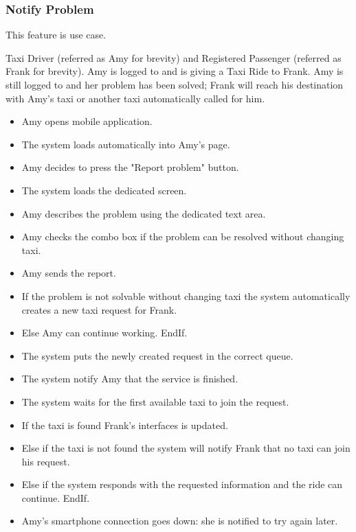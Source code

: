\subsubsection{Notify Problem}
This feature is  use case.
\begin{itemize}
	 Taxi Driver (referred as Amy for brevity) and Registered Passenger (referred as Frank for brevity).
	 Amy is logged to \myTaxiService{} and is giving a Taxi Ride to Frank.
	 Amy is still logged to \myTaxiService{} and her problem has been solved; Frank will reach his destination with Amy's taxi or another taxi automatically called for him.
	\begin{itemize}
		\item Amy opens \myTaxiService{} mobile application.
		\item The system loads automatically into Amy's page.
		\item Amy decides to press the "Report problem" button.
		\item The system loads the dedicated screen.
		\item Amy describes the problem using the dedicated text area.
		\item Amy checks the combo box if the problem can be resolved without changing taxi.
		\item Amy sends the report.
		\item If the problem is not solvable without changing taxi the system automatically creates a new taxi request for Frank.
		\item Else Amy can continue working. EndIf.
		\item The system puts the newly created request in the correct queue.
		\item The system notify Amy that the service is finished.
		\item The system waits for the first available taxi to join the request.
		\item If the taxi is found Frank's interfaces is updated.
		\item Else if the taxi is not found the system will notify Frank that no taxi can join his request.
		\item Else if the system responds with the requested information and the ride can continue. EndIf.
	\end{itemize}
	\begin{itemize}
		\item Amy's smartphone connection goes down: she is notified to try again later.
	\end{itemize}
\end{itemize}
